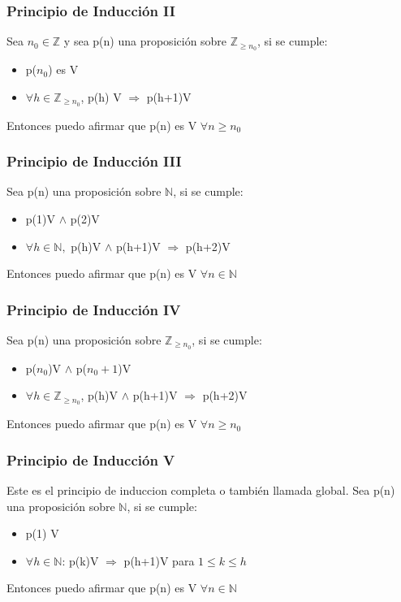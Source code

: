 \documentclass{article}
\begin{document}
\subsubsection{Principio de Inducción II}
Sea $n_0 \in \mathbb{Z}$ y sea p(n) una proposición sobre $\mathbb{Z}_{\geq n_0}$, si se cumple: \begin{itemize}
    \item p($n_0$) es V
    \item $\forall h \in \mathbb{Z}_{\geq n_0}$, p(h) V $\Rightarrow$ p(h+1)V
\end{itemize}
Entonces puedo afirmar que p(n) es V $\forall n \geq n_0$

\subsubsection{Principio de Inducción III}
Sea p(n) una proposición sobre $\mathbb {N}$, si se cumple:
\begin{itemize}
    \item p(1)V $\land$ p(2)V
    \item $\forall h \in \mathbb {N},$ p(h)V $\land$ p(h+1)V $\Rightarrow$ p(h+2)V
\end{itemize}
Entonces puedo afirmar que p(n) es V $\forall n \in \mathbb{N}$

\subsubsection{Principio de Inducción IV}
Sea p(n) una proposición sobre $\mathbb{Z}_{\geq n_0}$, si se cumple:
\begin{itemize}
    \item p($n_0$)V $\land$ p($n_0 + 1$)V
    \item $\forall h \in \mathbb{Z}_{\geq n_0}$, p(h)V $\land$ p(h+1)V $\Rightarrow$ p(h+2)V
\end{itemize}
Entonces puedo afirmar que p(n) es V $\forall n \geq n_0$

\subsubsection{Principio de Inducción V}
Este es el principio de induccion completa o también llamada global. Sea p(n) una proposición sobre $\mathbb {N}$, si se cumple:
\begin{itemize}
    \item p(1) V
    \item $\forall h \in \mathbb{N}$: p(k)V $\Rightarrow$ p(h+1)V para $1 \leq k \leq h$
\end{itemize}
Entonces puedo afirmar que p(n) es V $\forall n \in \mathbb{N}$
\end{document}
